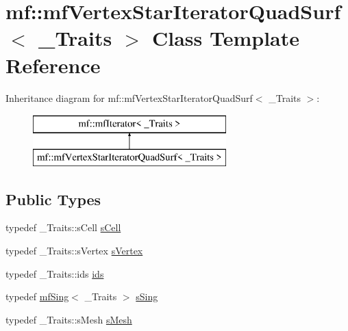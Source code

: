 \hypertarget{classmf_1_1mfVertexStarIteratorQuadSurf}{
\section{mf::mfVertexStarIteratorQuadSurf$<$ \_\-Traits $>$ Class Template Reference}
\label{classmf_1_1mfVertexStarIteratorQuadSurf}
}
Inheritance diagram for mf::mfVertexStarIteratorQuadSurf$<$ \_\-Traits $>$:\begin{figure}[H]
\begin{center}
\leavevmode
\includegraphics[height=2.000000cm]{classmf_1_1mfVertexStarIteratorQuadSurf}
\end{center}
\end{figure}
\subsection*{Public Types}
\begin{DoxyCompactItemize}
\item 
typedef \_\-Traits::sCell \hyperlink{classmf_1_1mfVertexStarIteratorQuadSurf_ae12c1c72db3d7cfc1240928080fa58f0}{sCell}
\item 
typedef \_\-Traits::sVertex \hyperlink{classmf_1_1mfVertexStarIteratorQuadSurf_ab31908dfd0f8e27af019e03d3771c0b8}{sVertex}
\item 
typedef \_\-Traits::ids \hyperlink{classmf_1_1mfVertexStarIteratorQuadSurf_a5c6de4cc45f4f21c3e30a4753fc9b22b}{ids}
\item 
typedef \hyperlink{classmf_1_1mfSing}{mfSing}$<$ \_\-Traits $>$ \hyperlink{classmf_1_1mfVertexStarIteratorQuadSurf_a8e91ca9813a3b27d6db68c9eb403ad77}{sSing}
\item 
typedef \_\-Traits::sMesh \hyperlink{classmf_1_1mfVertexStarIteratorQuadSurf_aad751ed48afa8c48bba2ed997bdd4676}{sMesh}
\end{DoxyCompactItemize}
